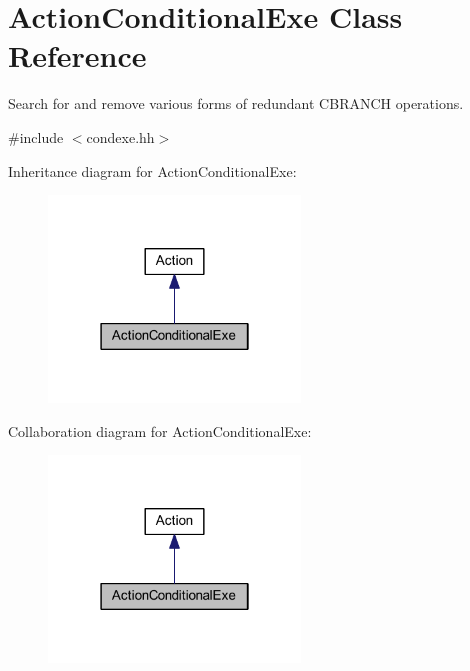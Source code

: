 \hypertarget{class_action_conditional_exe}{}\section{Action\+Conditional\+Exe Class Reference}
\label{class_action_conditional_exe}


Search for and remove various forms of redundant C\+B\+R\+A\+N\+CH operations.  




{\ttfamily \#include $<$condexe.\+hh$>$}



Inheritance diagram for Action\+Conditional\+Exe\+:
\nopagebreak
\begin{figure}[H]
\begin{center}
\leavevmode
\includegraphics[width=190pt]{class_action_conditional_exe__inherit__graph}
\end{center}
\end{figure}


Collaboration diagram for Action\+Conditional\+Exe\+:
\nopagebreak
\begin{figure}[H]
\begin{center}
\leavevmode
\includegraphics[width=190pt]{class_action_conditional_exe__coll__graph}
\end{center}
\end{figure}
